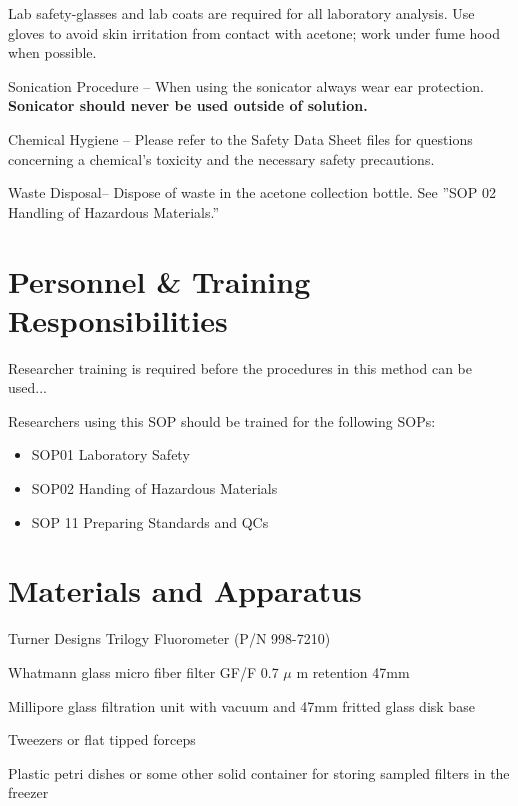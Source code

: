 \documentclass[12pt]{../SOP3}\usepackage[]{graphicx}\usepackage[]{color}
\begin{document}
\NP Lab safety-glasses and lab coats are required for all laboratory analysis. Use gloves to avoid skin irritation from contact with acetone; work under fume hood when possible. 

\NP Sonication Procedure -- When using the sonicator always wear ear protection. \textbf {Sonicator should never be used outside of solution.}

\NP Chemical Hygiene -- Please refer to the Safety Data Sheet files for questions concerning a chemical's toxicity and the necessary safety precautions.

\NP Waste Disposal-- Dispose of waste in the acetone collection bottle. See ''SOP 02 Handling of Hazardous Materials.'' %

\section{Personnel \& Training Responsibilities}

\NP Researcher training is required before the procedures in this method can be used... 

\NP Researchers using this SOP should be trained for the following SOPs:

\begin{itemize}
  \item SOP01 Laboratory Safety
  \item SOP02 Handing of Hazardous Materials
\item SOP 11 Preparing Standards and QCs %
\end{itemize}

\section{Materials and Apparatus}

\NP Turner Designs Trilogy Fluorometer (P/N 998-7210)

\NP Whatmann glass micro fiber filter GF/F 0.7 $\mu$  m retention 47mm 

\NP Millipore glass filtration unit with vacuum and 47mm fritted glass disk base 

\NP Tweezers or flat tipped forceps

\NP Plastic petri dishes or some other solid container for storing sampled filters in the freezer
\end{document}
